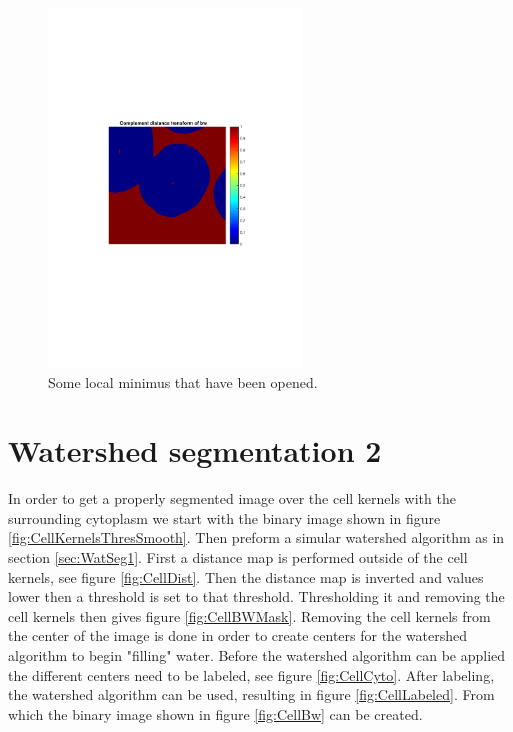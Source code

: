 \documentclass[10pt,twocolumn]{article}
\begin{document}
\begin{figure}[ht]
\centering
\includegraphics[width=0.6\textwidth]{Bilder/MinimumValesOpenedZoomedIn.pdf}
\caption{Some local minimus that have been opened.}
\label{fig:CellKernelsMinimumOpened}
\end{figure}

\section{Watershed segmentation 2}
In order to get a properly segmented image over the cell kernels with the
surrounding cytoplasm we start with the binary image shown in figure \ref{fig:CellKernelsThresSmooth}. Then preform a
simular watershed algorithm as in section \ref{sec:WatSeg1}. First a distance
map is performed outside of the cell kernels, see figure \ref{fig:CellDist}. Then the distance map is
inverted and values lower then a threshold is set to that threshold.
Thresholding it and removing the cell kernels then gives figure \ref{fig:CellBWMask}.
Removing the cell kernels from the center of the image is done in order to create centers for the
watershed algorithm to begin "filling" water. Before the watershed algorithm can
be applied the different centers need to be labeled, see figure \ref{fig:CellCyto}.
After labeling, the watershed algorithm can be used, resulting in figure \ref{fig:CellLabeled}.
From which the binary image shown in figure \ref{fig:CellBw} can be created.
\end{document}
